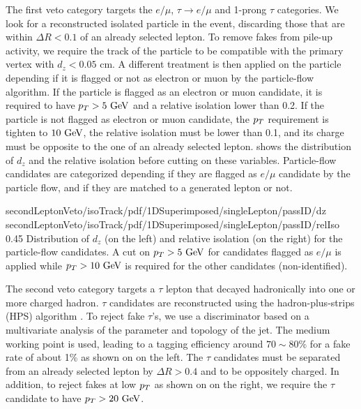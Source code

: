     The first veto category targets the $e/\mu$, $\tau \rightarrow e/\mu$ and
    1-prong $\tau$ categories. We look for a reconstructed isolated particle in the event,
    discarding those that are within $\Delta R < 0.1$ of an already selected lepton. To
    remove fakes from pile-up activity, we require the track of the particle to be
    compatible with the primary vertex with $d_z < 0.05$ cm. A different treatment is then
    applied on the particle depending if it is flagged or not as electron or muon by the
    particle-flow algorithm. If the particle is flagged as an electron or muon candidate,
    it is required to have $p_T > 5~\text{GeV}$ and a relative isolation lower than 0.2.
    If the particle is not flagged as electron or muon candidate, the $p_T$ requirement
    is tighten to $10~\text{GeV}$, the relative isolation must be lower than 0.1, and its charge
    must be opposite to the one of an already selected lepton.
     shows the distribution of $d_z$ and the
    relative isolation before cutting on these variables. Particle-flow candidates are categorized depending if
    they are flagged as $e/\mu$ candidate by the particle flow, and if they are matched to a
    generated lepton or not.

                     {secondLeptonVeto/isoTrack/pdf/1DSuperimposed/singleLepton/passID/dz}
                     {secondLeptonVeto/isoTrack/pdf/1DSuperimposed/singleLepton/passID/relIso}
                     {0.45}
                     {Distribution of $d_z$ (on the left) and relative isolation (on the right)
                     for the particle-flow candidates. A cut on $p_T > 5~\text{GeV}$ for candidates
                     flagged as $e/\mu$ is applied while $p_T > 10~\text{GeV}$ is required for
                     the other candidates (non-identified).}

    The second veto category targets a $\tau$ lepton that decayed hadronically
    into one or more charged hadron. $\tau$ candidates are reconstructed using the
    hadron-plus-strips (HPS) algorithm \cite{TauID}. To reject fake
    $\tau$'s, we use a discriminator based on a multivariate analysis of the parameter and
    topology of the jet. The medium working point is used, leading to a tagging efficiency
    around $70\sim80$\% for a fake rate of about 1\% as shown on 
    on the left. The $\tau$ candidates must be separated from an already selected lepton
    by $\Delta R > 0.4$ and to be oppositely charged. In addition, to reject fakes at low
    $p_T$ as shown on  on the right, we require the $\tau$
    candidate to have $p_T > 20~\text{GeV}$.

